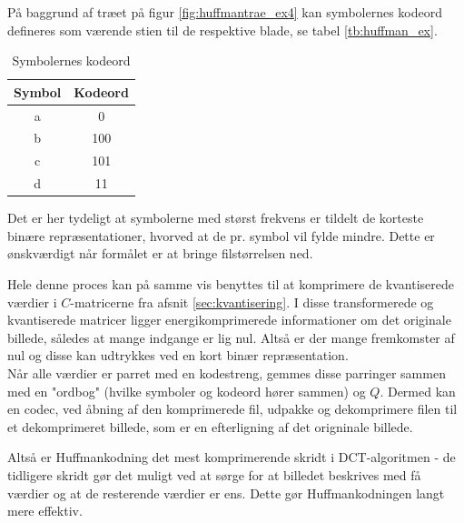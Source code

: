 På baggrund af træet på figur \vref{fig:huffmantrae_ex4} kan symbolernes kodeord defineres som værende stien til de respektive blade, se tabel \vref{tb:huffman_ex}.
\begin{table}[!h]
\centering
\begin{tabular}{|c|c|} 
\hline
\textbf{Symbol}	&	\textbf{Kodeord}	\\ \hline
a		&	0	\\ \hline
b		&	100	\\ \hline
c		&	101	\\ \hline
d		&	11	\\ \hline
\end{tabular}
\caption{Symbolernes kodeord}
\label{tb:huffman_ex}
\end{table}
Det er her tydeligt at symbolerne med størst frekvens er tildelt de korteste binære repræsentationer, hvorved at de pr. symbol vil fylde mindre. Dette er ønskværdigt når formålet er at bringe filstørrelsen ned.

Hele denne proces kan på samme vis benyttes til at komprimere de kvantiserede værdier i $C$-matricerne fra afsnit \ref{sec:kvantisering}. I disse transformerede og kvantiserede matricer ligger energikomprimerede informationer om det originale billede, således at mange indgange er lig nul. Altså er der mange fremkomster af nul og disse kan udtrykkes ved en kort binær repræsentation.\\
Når alle værdier er parret med en kodestreng, gemmes disse parringer sammen med en "ordbog" (hvilke symboler og kodeord hører sammen) og $Q$. Dermed kan en codec, ved åbning af den komprimerede fil, udpakke og dekomprimere filen til et dekomprimeret billede, som er en efterligning af det origninale billede.

Altså er Huffmankodning det mest komprimerende skridt i DCT-algoritmen - de tidligere skridt gør det muligt ved at sørge for at billedet beskrives med få værdier og at de resterende værdier er ens. Dette gør Huffmankodningen langt mere effektiv.